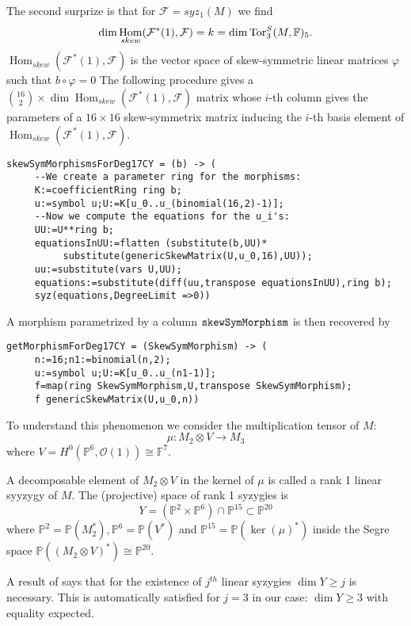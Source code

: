 \documentclass[12pt,leqno]{amsart}
\newcommand{\FF}{{\mathbb F}}
\newcommand{\PP}{{\mathbb P}}
\newcommand{\Tor}{{\rm{Tor}}}
\newcommand{\kf}{{\mathcal F}}
\newcommand{\ko}{{\mathcal O}}
\newcommand{\tensor}{\otimes}
\newlength{\ho}
\DeclareMathOperator{\Hom}{Hom}
\def\partitle#1{{\medskip\noindent {\bf #1.\hbox to 12pt{}}}} %
\begin{document}
\medskip
The second surprize is that for $\kf = syz_1(M)$ we find
$$\dim \Hom_{skew}(\kf^*(1),\kf) =k= \dim \Tor_3^S(M,\FF)_5.$$
$\Hom_{skew}(\kf^*(1),\kf)$ is the vector space of skew-symmetric
linear matrices $\varphi$ such that $b \circ \varphi = 0$
The following procedure
gives a $\binom{16}2\times\dim \Hom_{skew}(\kf^*(1),\kf)$ matrix 
whose $i$-th column gives the parameters of a $16\times16$
skew-symmetrix 
matrix 
inducing the $i$-th basis element of $\Hom_{skew}(\kf^*(1),\kf)$.
{\scriptsize
\begin{verbatim} 
skewSymMorphismsForDeg17CY = (b) -> (
     --We create a parameter ring for the morphisms: 
     K:=coefficientRing ring b;
     u:=symbol u;U:=K[u_0..u_(binomial(16,2)-1)];
     --Now we compute the equations for the u_i's:
     UU:=U**ring b;
     equationsInUU:=flatten (substitute(b,UU)*
          substitute(genericSkewMatrix(U,u_0,16),UU));
     uu:=substitute(vars U,UU);
     equations:=substitute(diff(uu,transpose equationsInUU),ring b);
     syz(equations,DegreeLimit =>0))
\end{verbatim}}
A morphism parametrized by a column $\tt skewSymMorphism$ is then recovered by 
{\scriptsize
\begin{verbatim} 
getMorphismForDeg17CY = (SkewSymMorphism) -> (
     n:=16;n1:=binomial(n,2);
     u:=symbol u;U:=K[u_0..u_(n1-1)];
     f=map(ring SkewSymMorphism,U,transpose SkewSymMorphism);
     f genericSkewMatrix(U,u_0,n))
\end{verbatim}}




\partitle{Rank-1 linear syzygies of $M$}
To understand this phenomenon we consider the multiplication tensor of $M$:
$$\mu \colon M_2 \tensor V \to M_3$$
where $V=H^0(\PP^6,\ko(1))\cong \FF^7$. 

\begin{definition} A decomposable element of $M_2 \tensor V$ in the kernel of 
$\mu$ is called a rank 1 linear syyzygy of $M$.
The (projective) space of rank 1 syzygies is
$$Y=(\PP^2 \times \PP^6) \cap \PP^{15} \subset \PP^{20}$$
where $\PP^2=\PP(M_2^*),\PP^6=\PP(V^*)$ and $\PP^{15}=\PP(\ker(\mu)^*)$
inside the Segre space $\PP((M_2 \tensor V)^*)\cong \PP^{20}$. 
\end{definition}

A result of \cite{Gr1} says that for the existence of $j^{th}$ linear syzygies
$\dim Y \ge j$ is necessary. This is automatically satisfied for $j=3$
in our case: $\dim Y \ge 3$ with equality expected. 
\end{document}
